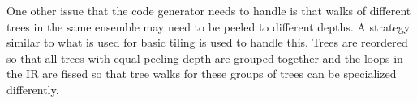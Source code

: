 {One other issue that the code generator needs to handle is that walks of different trees in the same ensemble may 
need to be peeled to different depths. A strategy similar to what is used for basic tiling is used to handle this.
Trees are reordered so that all trees 
with equal peeling depth are grouped together and the loops in the IR are fissed so that tree walks 
for these groups of trees can be specialized differently.
}